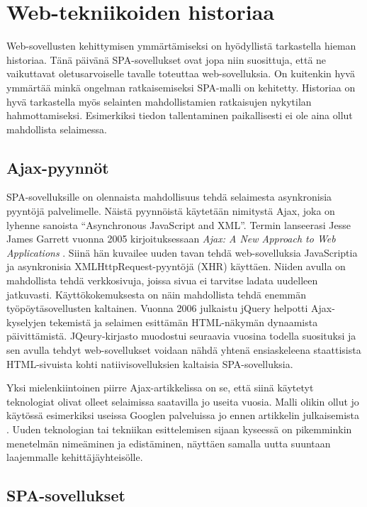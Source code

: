 \documentclass[finnish,twoside,censored,csm,sw-track-2018]{HYthesisML}
\begin{document}
\chapter{Web-tekniikoiden historiaa}
\label{web-history}

Web-sovellusten kehittymisen ymmärtämiseksi on hyödyllistä tarkastella hieman historiaa. Tänä päivänä SPA-sovellukset ovat jopa niin suosittuja, että ne vaikuttavat oletusarvoiselle tavalle toteuttaa web-sovelluksia. On kuitenkin hyvä ymmärtää minkä ongelman ratkaisemiseksi SPA-malli on kehitetty. Historiaa on hyvä tarkastella myös selainten mahdollistamien ratkaisujen nykytilan hahmottamiseksi. Esimerkiksi tiedon tallentaminen paikallisesti ei ole aina ollut mahdollista selaimessa.

\section{Ajax-pyynnöt}

SPA-sovelluksille on olennaista mahdollisuus tehdä selaimesta asynkronisia pyyntöjä palvelimelle. Näistä pyynnöistä käytetään nimitystä Ajax, joka on lyhenne sanoista ``Asynchronous JavaScript and XML''. Termin lanseerasi Jesse James Garrett vuonna 2005 kirjoituksessaan \textit{Ajax: A New Approach to Web Applications} \citep{Ajax}. Siinä hän kuvailee uuden tavan tehdä web-sovelluksia JavaScriptia ja asynkronisia XMLHttpRequest-pyyntöjä (XHR) käyttäen. Niiden avulla on mahdollista tehdä verkkosivuja, joissa sivua ei tarvitse ladata uudelleen jatkuvasti. Käyttökokemuksesta on näin mahdollista tehdä enemmän työpöytäsovellusten kaltainen. Vuonna 2006 julkaistu jQuery \cite{JSdefguide} helpotti Ajax-kyselyjen tekemistä ja selaimen esittämän HTML-näkymän dynaamista päivittämistä. JQeury-kirjasto muodostui seuraavia vuosina todella suosituksi ja sen avulla tehdyt web-sovellukset voidaan nähdä yhtenä ensiaskeleena staattisista HTML-sivuista kohti natiivisovelluksien kaltaisia SPA-sovelluksia.

Yksi mielenkiintoinen piirre Ajax-artikkelissa on se, että siinä käytetyt teknologiat olivat olleet selaimissa saatavilla jo useita vuosia. Malli olikin ollut jo käytössä esimerkiksi useissa Googlen palveluissa jo ennen artikkelin julkaisemista \citep{Ajax}. Uuden teknologian tai tekniikan esittelemisen sijaan kyseessä on pikemminkin menetelmän nimeäminen ja edistäminen, näyttäen samalla uutta suuntaan laajemmalle kehittäjäyhteisölle.

\section{SPA-sovellukset}
\end{document}
